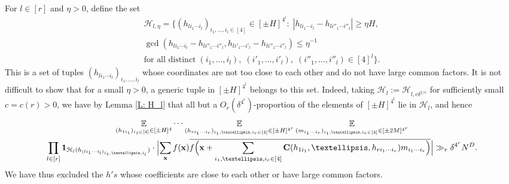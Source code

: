 \documentclass[11pt]{amsart}
\theoremstyle{definition}
\DeclareMathOperator*{\E}{\mathbb{E}}
\newcommand{\CH}{{\mathcal H}}
\newcommand{\bc}{{\mathbf{C}}}
\newcommand{\bx}{{\mathbf{x}}}
\newcommand{\inv}{^{-1}}
\newcommand{\Bigabs}[1]{\Bigl| #1 \Bigr|}
\newcommand{\Bigbrac}[1]{\Bigl( #1 \Bigr)}
\begin{document}
For $l\in[r]$ and $\eta>0$, define the set
\begin{multline*}
    \CH_{l,\eta} = \{(h_{li_1\cdots i_l})_{i_1, \ldots, i_l\in[4]}\in[\pm H]^{4^l}:\; |h_{li_1\cdots i_l}-h_{li''_1\cdots i''_l}|\geq \eta H,\\ \gcd(h_{li_1\cdots i_l}-h_{li''_1\cdots i''_l}, h_{li'_1\cdots i'_l}-h_{li''_1\cdots i''_l})\leq \eta\inv\\
    \textrm{for {all} distinct}\; (i_1, \ldots, i_l),\; (i'_1, \ldots, i'_l),\; (i''_1, \ldots, i''_l)\in[4]^l\}.
\end{multline*}
This is a set of tuples $(h_{li_1\cdots i_l})_{i_1, \ldots, i_l}$ whose coordinates are not too close to each other and do not have large common factors. It is not difficult to show that for a small $\eta>0$, a generic tuple in $[\pm H]^{4^l}$ belongs to this set.
Indeed, taking $\CH_l := \CH_{l,c\delta^{1/c}}$ for sufficiently small $c= c(r)>0$, we have by Lemma \ref{L: H_l} that all but a $O_r(\delta^{4^r})$-proportion of the elements of $[\pm H]^{4^l}$ lie in $\CH_l$, and hence
\begin{multline*}
    \E_{(h_{1i_1})_{i_1\in [4]}\in[\pm H]^4}
    \cdots \E_{(h_{ri_1\cdots i_r})_{i_1, \ldots,  i_r\in [4]}\in[\pm H]^{4^r}}\E_{(m_{i_1\cdots  i_r})_{i_1, \ldots, i_r\in[4]}\in[\pm 2M]^{4^r}}\\
    \prod_{l\in[r]}\mathbf{1}_{\CH_l(h_{(li_1\cdots i_l)_{i_1, \ldots, i_l}})}\cdot\Bigabs{\sum_\bx f(\bx)\overline{f\Bigbrac{\bx+\sum_{\substack{i_1,\ldots, i_r\in[4]}}\bc(h_{1i_1}, \ldots, h_{ri_1\cdots  i_r})m_{i_1\cdots  i_r}}}}\gg_r \delta^{4^r} N^D.
\end{multline*}
We have thus excluded the $h's$ whose coefficients are close to each other or have large common factors.
\end{document}
